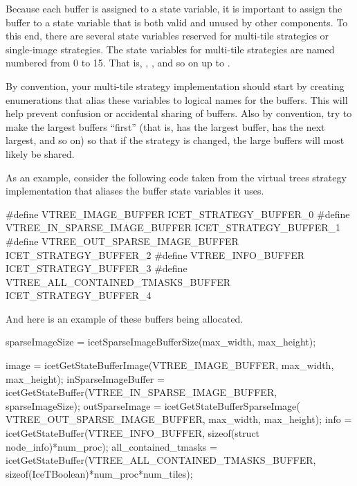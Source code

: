 Because each buffer is assigned to a state variable, it is important to
assign the buffer to a state variable that is both valid and unused by
other \IceT components.  To this end, there are several state variables
reserved for multi-tile strategies or single-image strategies.  The state
variables for multi-tile strategies are named
 numbered from 0 to 15.  That
is, , ,
and so on up to .

By convention, your multi-tile strategy implementation should start by
creating  enumerations that alias these variables to
logical names for the buffers.  This will help prevent confusion or
accidental sharing of buffers.  Also by convention, try to make the largest
buffers ``first'' (that is,  has the
largest buffer,  has the next largest, and
so on) so that if the strategy is changed, the large buffers will most
likely be shared.

As an example, consider the following code taken from the virtual trees
strategy implementation that aliases the buffer state variables it uses.

\begin{code}
#define VTREE_IMAGE_BUFFER              ICET_STRATEGY_BUFFER_0
#define VTREE_IN_SPARSE_IMAGE_BUFFER    ICET_STRATEGY_BUFFER_1
#define VTREE_OUT_SPARSE_IMAGE_BUFFER   ICET_STRATEGY_BUFFER_2
#define VTREE_INFO_BUFFER               ICET_STRATEGY_BUFFER_3
#define VTREE_ALL_CONTAINED_TMASKS_BUFFER ICET_STRATEGY_BUFFER_4
\end{code}

And here is an example of these buffers being allocated.

\begin{code}
sparseImageSize = icetSparseImageBufferSize(max_width, max_height);

image                = icetGetStateBufferImage(VTREE_IMAGE_BUFFER,
                                               max_width, max_height);
inSparseImageBuffer  = icetGetStateBuffer(VTREE_IN_SPARSE_IMAGE_BUFFER,
                                          sparseImageSize);
outSparseImage       = icetGetStateBufferSparseImage(
                                              VTREE_OUT_SPARSE_IMAGE_BUFFER,
                                              max_width, max_height);
info                 = icetGetStateBuffer(VTREE_INFO_BUFFER,
                                         sizeof(struct node_info)*num_proc);
all_contained_tmasks = icetGetStateBuffer(VTREE_ALL_CONTAINED_TMASKS_BUFFER,
                                    sizeof(IceTBoolean)*num_proc*num_tiles);
\end{code}

